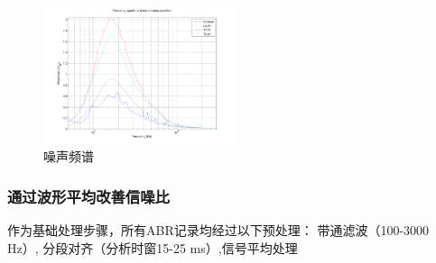 \begin{figure}[H]
  \centering
  \includegraphics[width=0.5\textwidth]{images/FrequencyspectrumOfNon-StimulusCondition-1.png}
  \caption{噪声频谱}
  \label{fig:FrequencyspectrumOfNon-Stimulus}
\end{figure}
\subsubsection{通过波形平均改善信噪比}
作为基础处理步骤，所有ABR记录均经过以下预处理：
带通滤波（100-3000 Hz）, 分段对齐（分析时窗15-25 ms）,信号平均处理

